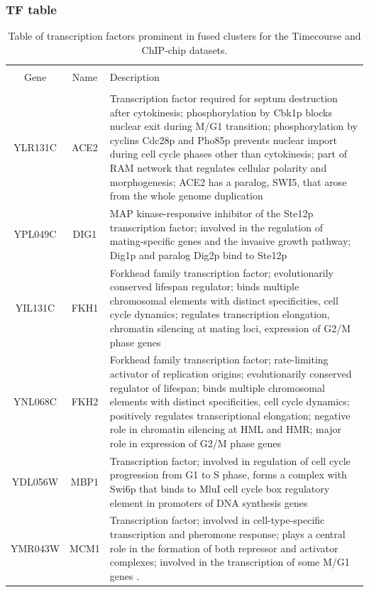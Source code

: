 \documentclass[]{article}
\begin{document}
\subsubsection{TF table}
	\begin{longtable}{@{\extracolsep{3pt}} ccp{85mm}} 
	\caption{Table of transcription factors prominent in fused clusters for the Timecourse and ChIP-chip datasets.}
	\\[-1.8ex]\hline 
	\hline \\[-1.8ex] 
	Gene & Name & Description \\ 
	\hline \\[-1.8ex] 
		YLR131C & ACE2 & Transcription factor required for septum destruction after cytokinesis; phosphorylation by Cbk1p blocks nuclear exit during M/G1 transition; phosphorylation by cyclins Cdc28p and Pho85p prevents nuclear import during cell cycle phases other than cytokinesis; part of RAM network that regulates cellular polarity and morphogenesis; ACE2 has a paralog, SWI5, that arose from the whole genome duplication \\ 
		YPL049C & DIG1 & MAP kinase-responsive inhibitor of the Ste12p transcription factor; involved in the regulation of mating-specific genes and the invasive growth pathway; Dig1p and paralog Dig2p bind to Ste12p
		\\ 
		YIL131C & FKH1 & Forkhead family transcription factor; evolutionarily conserved lifespan regulator; binds multiple chromosomal elements with distinct specificities, cell cycle dynamics; regulates transcription elongation, chromatin silencing at mating loci, expression of G2/M phase genes \\ 
		YNL068C & FKH2 & Forkhead family transcription factor; rate-limiting activator of replication origins; evolutionarily conserved regulator of lifespan; binds multiple chromosomal elements with distinct specificities, cell cycle dynamics; positively regulates transcriptional elongation; negative role in chromatin silencing at HML and HMR; major role in expression of G2/M phase genes \\ 
		YDL056W & MBP1 & Transcription factor; involved in regulation of cell cycle progression from G1 to S phase, forms a complex with Swi6p that binds to MluI cell cycle box regulatory element in promoters of DNA synthesis genes \\ 
		YMR043W & MCM1 & Transcription factor; involved in cell-type-specific transcription and pheromone response; plays a central role in the formation of both repressor and activator complexes; involved in the transcription of some M/G1 genes \cite{simon2001serial}.  \\ 

\end{longtable}
\end{document}
